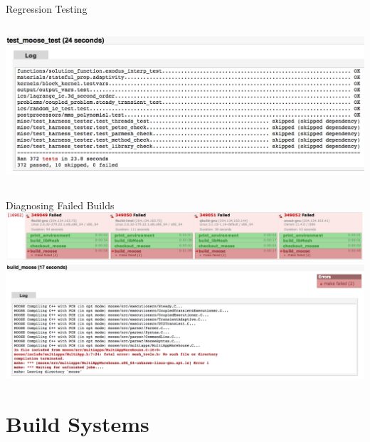 \documentclass[mathserif]{beamer}
\begin{document}
\begin{frame}[t]{Regression Testing}
\begin{columns}
    \includegraphics[width=\textwidth]{moosetest_log}
  \end{columns}
\end{frame}


\begin{frame}{Diagnosing Failed Builds}
  \includegraphics[width=\textwidth]{failed_build}
  \\
  \vspace{.1\textheight}
  \includegraphics[width=\textwidth]{failed_build_details}
\end{frame}



\section{Build Systems}
\end{document}

